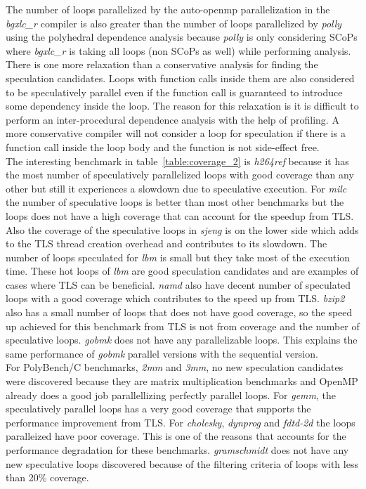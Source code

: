 \documentclass[10pt]{report}          %
\begin{document}
The number of loops parallelized by the auto-openmp parallelization in the \textit{bgxlc\_r} compiler is also greater than the number of loops parallelized by \textit{polly} using the polyhedral dependence analysis because \textit{polly} is only considering SCoPs where \textit{bgxlc\_r} is taking all loops (non SCoPs as well) while performing analysis.\\

There is one more relaxation than a conservative analysis for finding the speculation candidates.  Loops with function calls inside them are also considered to be speculatively parallel even if the function call is guaranteed to introduce some dependency inside the loop.  The reason for this relaxation is it is difficult to perform an inter-procedural dependence analysis with the help of profiling.  A more conservative compiler will not consider a loop for speculation if there is a function call inside the loop body and the function is not side-effect free. \\

The interesting benchmark in table~\ref{table:coverage_2} is \textit{h264ref} because it has the most number of speculatively parallelized loops with good coverage than any other but still it experiences a slowdown due to speculative execution.  For \textit{milc} the number of speculative loops is better than most other benchmarks but the loops does not have a high coverage that can account for the speedup from TLS.  Also the coverage of the speculative loops in \textit{sjeng} is on the lower side which adds to the TLS thread creation overhead and contributes to its slowdown.  The number of loops speculated for \textit{lbm} is small but they take most of the execution  time.  These hot loops of \textit{lbm} are good speculation candidates and are examples of cases where TLS can be beneficial.  \textit{namd} also have decent number of speculated loops with a good coverage which contributes to the speed up from TLS.  \textit{bzip2} also has a small number of loops that does not have good coverage, so the speed up achieved for this benchmark from TLS is not from coverage and the number of speculative loops. \textit{gobmk} does not have any parallelizable loops.  This explains the same performance of \textit{gobmk} parallel versions with the sequential version. \\

For PolyBench/C benchmarks, \textit{2mm} and \textit{3mm}, no new speculation candidates were discovered because they are matrix multiplication benchmarks and OpenMP already does a good job parallellizing perfectly parallel loops. For \textit{gemm}, the speculatively parallel loops has a very good coverage that supports the performance improvement from TLS.  For \textit{cholesky}, \textit{dynprog} and \textit{fdtd-2d} the loops paralleized have poor coverage.  This is one of the reasons that accounts for the performance degradation for these benchmarks. \textit{gramschmidt} does not have any new speculative loops discovered because of the filtering criteria of loops with less than 20\% coverage.
\end{document}
